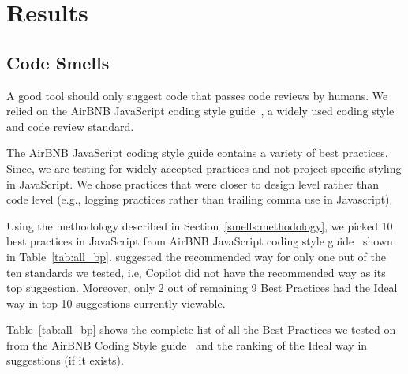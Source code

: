 \section{Results}
\subsection{Code Smells}
\label{bp}
A good \AISE{} tool should only suggest code that passes code reviews by humans. We relied on the AirBNB JavaScript coding style guide~\cite{airbnb_code}, a widely used coding style and code review standard. 

The AirBNB JavaScript coding style guide contains a variety of best practices. 
Since, we are testing \cop{} for widely accepted practices and not project specific styling in JavaScript. We chose practices that were closer to design level rather than code level (e.g., logging practices rather than trailing comma use in Javascript).

Using the methodology described in Section~\ref{smells:methodology}, we picked 10 best practices in JavaScript from AirBNB JavaScript coding style guide~\cite{airbnb_code} shown in Table~\ref{tab:all_bp}. \cop{} suggested the recommended way for only one out of the ten standards we tested, i.e, Copilot did not have the recommended way as its top suggestion. Moreover, only 2 out of remaining 9 Best Practices had the Ideal way in \cop{} top 10 suggestions currently viewable. 


Table~\ref{tab:all_bp} shows the complete list of all the Best Practices we tested on \cop{} from the AirBNB Coding Style guide~\cite{airbnb_code} and the ranking of the Ideal way in \cop{} suggestions (if it exists).

